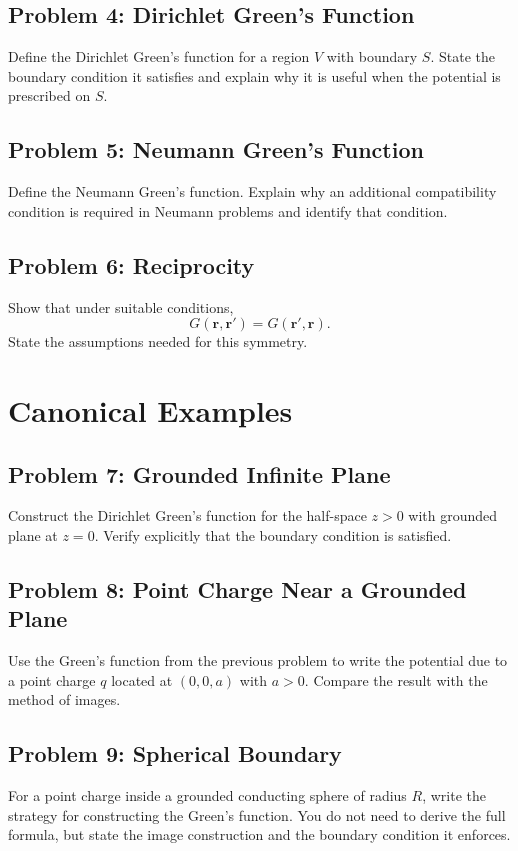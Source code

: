 \documentclass[hidelinks]{article}
\begin{document}
\subsection{Problem 4: Dirichlet Green's Function}
Define the Dirichlet Green's function for a region $V$ with boundary $S$. State the boundary condition it satisfies and explain why it is useful when the potential is prescribed on $S$.

\subsection{Problem 5: Neumann Green's Function}
Define the Neumann Green's function. Explain why an additional compatibility condition is required in Neumann problems and identify that condition.

\subsection{Problem 6: Reciprocity}
Show that under suitable conditions,
\[
G(\mathbf{r},\mathbf{r}')=G(\mathbf{r}',\mathbf{r}).
\]
State the assumptions needed for this symmetry.

\section{Canonical Examples}
\subsection{Problem 7: Grounded Infinite Plane}
Construct the Dirichlet Green's function for the half-space $z>0$ with grounded plane at $z=0$. Verify explicitly that the boundary condition is satisfied.

\subsection{Problem 8: Point Charge Near a Grounded Plane}
Use the Green's function from the previous problem to write the potential due to a point charge $q$ located at $(0,0,a)$ with $a>0$. Compare the result with the method of images.

\subsection{Problem 9: Spherical Boundary}
For a point charge inside a grounded conducting sphere of radius $R$, write the strategy for constructing the Green's function. You do not need to derive the full formula, but state the image construction and the boundary condition it enforces.
\end{document}
